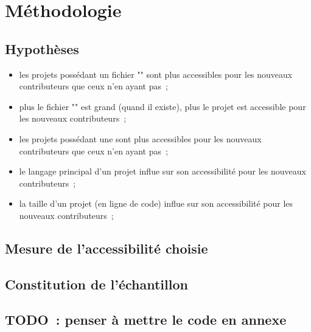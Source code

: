 \chapter{Méthodologie}

\section{Hypothèses}


\begin{itemize}
    \item les projets possédant un fichier "" sont plus accessibles pour les nouveaux contributeurs
        que ceux n'en ayant pas ;
    \item plus le fichier "" est grand (quand il existe), plus le projet est accessible pour les
        nouveaux contributeurs ;
    \item les projets possédant une  sont plus accessibles pour les nouveaux contributeurs que
        ceux n'en ayant pas ;
    \item le langage principal d'un projet influe sur son accessibilité pour les nouveaux contributeurs ;
    \item la taille d'un projet (en ligne de code) influe sur son accessibilité pour les nouveaux
        contributeurs ;
\end{itemize}

\section{Mesure de l'accessibilité choisie}


\section{Constitution de l'échantillon}


\section*{TODO : penser à mettre le code en annexe}
